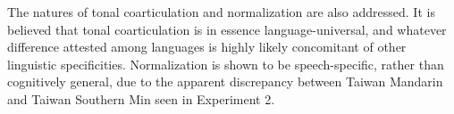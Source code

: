 The natures of tonal coarticulation and normalization are also addressed. It is believed that tonal coarticulation is in essence language-universal, and whatever difference attested among languages is highly likely concomitant of other linguistic specificities. Normalization is shown to be speech-specific, rather than cognitively general, due to the apparent discrepancy between Taiwan Mandarin and Taiwan Southern Min seen in Experiment 2.
